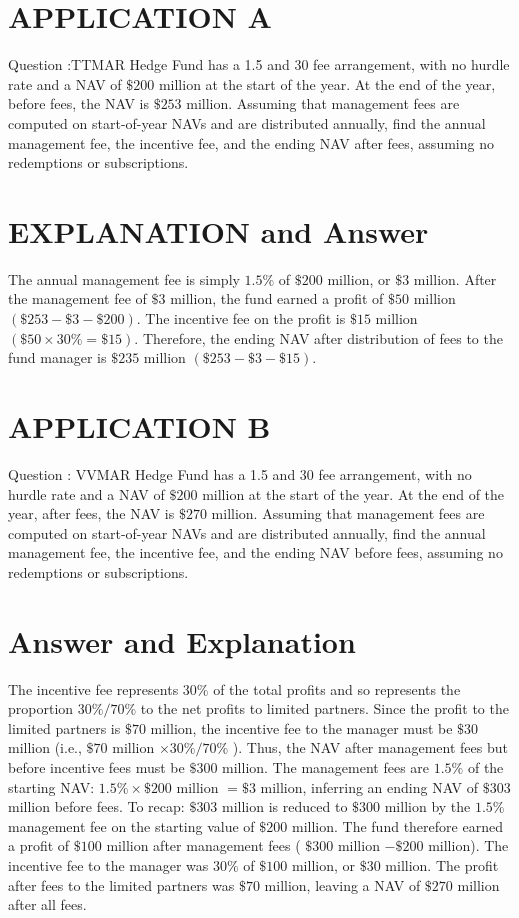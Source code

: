 \documentclass[11pt]{article}
\begin{document}
\section*{APPLICATION A}
Question :TTMAR Hedge Fund has a 1.5 and 30 fee arrangement, with no hurdle rate and a NAV of $\$ 200$ million at the start of the year. At the end of the year, before fees, the NAV is $\$ 253$ million. Assuming that management fees are computed on start-of-year NAVs and are distributed annually, find the annual management fee, the incentive fee, and the ending NAV after fees, assuming no redemptions or subscriptions.

\section*{EXPLANATION and Answer}
The annual management fee is simply $1.5 \%$ of $\$ 200$ million, or $\$ 3$ million. After the management fee of $\$ 3$ million, the fund earned a profit of $\$ 50$ million $(\$ 253-\$ 3-\$ 200)$. The incentive fee on the profit is $\$ 15$ million $(\$ 50 \times 30 \%=\$ 15)$. Therefore, the ending NAV after distribution of fees to the fund manager is $\$ 235$ million $(\$ 253-\$ 3-\$ 15)$.

\section*{APPLICATION B}
Question : VVMAR Hedge Fund has a 1.5 and 30 fee arrangement, with no hurdle rate and a NAV of $\$ 200$ million at the start of the year. At the end of the year, after fees, the NAV is $\$ 270$ million. Assuming that management fees are computed on start-of-year NAVs and are distributed annually, find the annual management fee, the incentive fee, and the ending NAV before fees, assuming no redemptions or subscriptions.

\section*{Answer and Explanation}
The incentive fee represents $30 \%$ of the total profits and so represents the proportion $30 \% / 70 \%$ to the net profits to limited partners. Since the profit to the limited partners is $\$ 70$ million, the incentive fee to the manager must be $\$ 30$ million (i.e., $\$ 70$ million $\times 30 \% / 70 \%$ ). Thus, the NAV after management fees but before incentive fees must be $\$ 300$ million. The management fees are $1.5 \%$ of the starting NAV: $1.5 \% \times \$ 200$ million $=\$ 3$ million, inferring an ending NAV of $\$ 303$ million before fees. To recap: $\$ 303$ million is reduced to $\$ 300$ million by the $1.5 \%$ management fee on the starting value of $\$ 200$ million. The fund therefore earned a profit of $\$ 100$ million after management fees ( $\$ 300$ million $-\$ 200$ million). The incentive fee to the manager was $30 \%$ of $\$ 100$ million, or $\$ 30$ million. The profit after fees to the limited partners was $\$ 70$ million, leaving a NAV of $\$ 270$ million after all fees.
\end{document}
